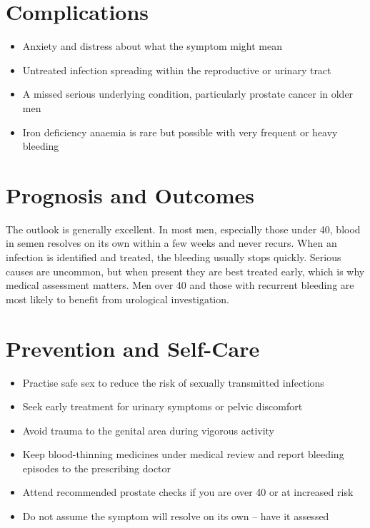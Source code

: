 \section*{Complications}
\begin{itemize}
    \item Anxiety and distress about what the symptom might mean
    \item Untreated infection spreading within the reproductive or urinary tract
    \item A missed serious underlying condition, particularly prostate cancer in older men
    \item Iron deficiency anaemia is rare but possible with very frequent or heavy bleeding
\end{itemize}

\section*{Prognosis and Outcomes}
The outlook is generally excellent. In most men, especially those under 40, blood in semen resolves on its own within a few weeks and never recurs. When an infection is identified and treated, the bleeding usually stops quickly. Serious causes are uncommon, but when present they are best treated early, which is why medical assessment matters. Men over 40 and those with recurrent bleeding are most likely to benefit from urological investigation.

\section*{Prevention and Self-Care}
\begin{itemize}
    \item Practise safe sex to reduce the risk of sexually transmitted infections
    \item Seek early treatment for urinary symptoms or pelvic discomfort
    \item Avoid trauma to the genital area during vigorous activity
    \item Keep blood-thinning medicines under medical review and report bleeding episodes to the prescribing doctor
    \item Attend recommended prostate checks if you are over 40 or at increased risk
    \item Do not assume the symptom will resolve on its own -- have it assessed
\end{itemize}

